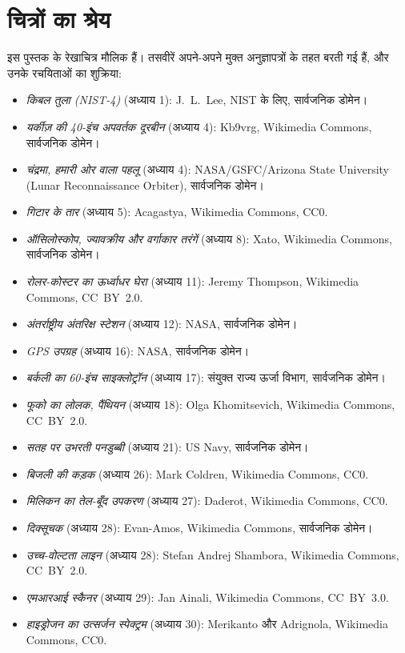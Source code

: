 \chapter*{चित्रों का श्रेय}

इस पुस्तक के रेखाचित्र मौलिक हैं। तसवीरें अपने-अपने मुक्त अनुज्ञापत्रों
के तहत बरती गई हैं, और उनके रचयिताओं का शुक्रिया:

\begin{itemize}
  \item \emph{किबल तुला (NIST-4)} (अध्याय 1): J.~L.~Lee, NIST के
        लिए, सार्वजनिक डोमेन।
  \item \emph{यर्कीज़ की 40-इंच अपवर्तक दूरबीन} (अध्याय 4): Kb9vrg,
        Wikimedia Commons, सार्वजनिक डोमेन।
  \item \emph{चंद्रमा, हमारी ओर वाला पहलू} (अध्याय 4):
        NASA/GSFC/Arizona State University (Lunar Reconnaissance
        Orbiter), सार्वजनिक डोमेन।
  \item \emph{गिटार के तार} (अध्याय 5): Acagastya, Wikimedia
        Commons, CC0.
  \item \emph{ऑसिलोस्कोप, ज्यावक्रीय और वर्गाकार तरंगें} (अध्याय 8):
        Xato, Wikimedia Commons, सार्वजनिक डोमेन।
  \item \emph{रोलर-कोस्टर का ऊर्ध्वाधर घेरा} (अध्याय 11): Jeremy
        Thompson, Wikimedia Commons, CC~BY~2.0.
  \item \emph{अंतर्राष्ट्रीय अंतरिक्ष स्टेशन} (अध्याय 12): NASA,
        सार्वजनिक डोमेन।
  \item \emph{GPS उपग्रह} (अध्याय 16): NASA, सार्वजनिक डोमेन।
  \item \emph{बर्कली का 60-इंच साइक्लोट्रॉन} (अध्याय 17): संयुक्त
        राज्य ऊर्जा विभाग, सार्वजनिक डोमेन।
  \item \emph{फूको का लोलक, पैंथियन} (अध्याय 18): Olga Khomitsevich,
        Wikimedia Commons, CC~BY~2.0.
  \item \emph{सतह पर उभरती पनडुब्बी} (अध्याय 21): US Navy,
        सार्वजनिक डोमेन।
  \item \emph{बिजली की कड़क} (अध्याय 26): Mark Coldren, Wikimedia
        Commons, CC0.
  \item \emph{मिलिकन का तेल-बूँद उपकरण} (अध्याय 27): Daderot,
        Wikimedia Commons, CC0.
  \item \emph{दिक्सूचक} (अध्याय 28): Evan-Amos, Wikimedia Commons,
        सार्वजनिक डोमेन।
  \item \emph{उच्च-वोल्टता लाइन} (अध्याय 28): Stefan Andrej
        Shambora, Wikimedia Commons, CC~BY~2.0.
  \item \emph{एमआरआई स्कैनर} (अध्याय 29): Jan Ainali, Wikimedia
        Commons, CC~BY~3.0.
  \item \emph{हाइड्रोजन का उत्सर्जन स्पेक्ट्रम} (अध्याय 30):
        Merikanto और Adrignola, Wikimedia Commons, CC0.
\end{itemize}

